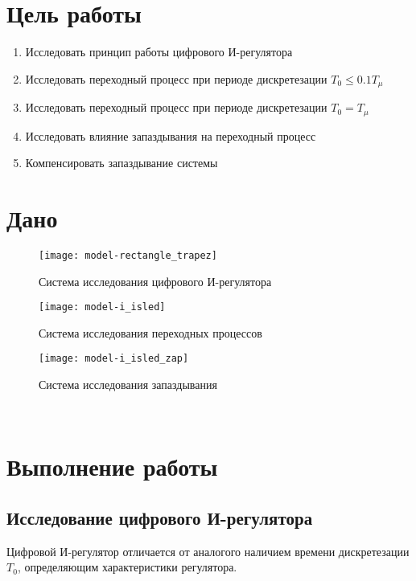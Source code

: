 


    


    \section{Цель работы}
    \begin{enumerate}
        \item Исследовать принцип работы цифрового И-регулятора
        \item Исследовать переходный процесс при периоде дискретезации $T_0\leq0.1T_\mu$
        \item Исследовать переходный процесс при периоде дискретезации $T_0=T_\mu$
        \item Исследовать влияние запаздывания на переходный процесс
        \item Компенсировать запаздывание системы
    \end{enumerate}


    \section{Дано}
    \begin{figure}[H]
        \centering\texttt{[image: model-rectangle\_trapez]}
        \caption{Система исследования цифрового И-регулятора}
    \end{figure}
    \begin{figure}[H]
        \centering\texttt{[image: model-i\_isled]}
        \caption{Система исследования переходных процессов}
    \end{figure}
    \begin{figure}[H]
        \centering\texttt{[image: model-i\_isled\_zap]}
        \caption{Система исследования запаздывания}
    \end{figure}

    \begin{center}
        \noindent{}\\
    \end{center}


    \section{Выполнение работы}

    \subsection{Исследование цифрового И-регулятора}
    Цифровой И-регулятор отличается от аналогого наличием времени дискретезации $T_0$,
    определяющим характеристики регулятора.

